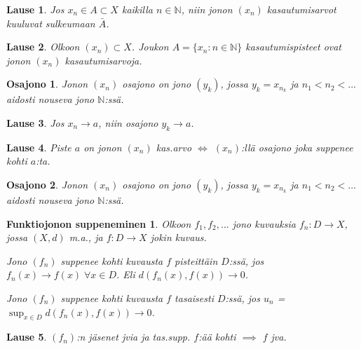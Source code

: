 \documentclass[landscape,a4paper,9pt]{extarticle}
\theoremstyle{customtheoremstyle}
\newtheorem*{theorem}{Lause}
\begin{document}
\begin{multicols*}{3}
\begin{theorem}
  Jos $x_n \in A \subset X$ kaikilla $n \in \mathbb{N}$, niin jonon $(x_n)$
  kasautumisarvot kuuluvat sulkeumaan $\bar{A}$.
\end{theorem}

\begin{theorem}
  Olkoon $(x_n) \subset X$. Joukon $A = \{x_n : n \in \mathbb{N} \}$
  kasautumispisteet ovat jonon $(x_n)$ kasautumisarvoja.
\end{theorem}

\newtheorem*{defn:osajono}{Osajono}
\begin{defn:osajono}
  Jonon $(x_n)$ osajono on jono $(y_k)$, jossa $y_k = x_{n_k}$ ja $n_1 < n_2 <
  ...$ aidosti nouseva jono $\mathbb{N}$:ssä.
\end{defn:osajono}

\begin{theorem}
  Jos $x_n \rightarrow a$, niin osajono $y_k \rightarrow a$.
\end{theorem}

\begin{theorem}
  Piste $a$ on jonon $(x_n)$ kas.arvo $\iff$ $(x_n)$:llä osajono joka suppenee
  kohti $a$:ta.
\end{theorem}

\newtheorem*{defn:}{Osajono}
\begin{defn:osajono}
  Jonon $(x_n)$ osajono on jono $(y_k)$, jossa $y_k = x_{n_k}$ ja $n_1 < n_2 <
  ...$ aidosti nouseva jono $\mathbb{N}$:ssä.
\end{defn:osajono}

\newtheorem*{defn:funktiojono}{Funktiojonon suppeneminen}
\begin{defn:funktiojono}
  Olkoon $f_1, f_2, ...$ jono kuvauksia $f_n : D \rightarrow X$, jossa $(X,d)$
  m.a., ja $f: D \rightarrow X$ jokin kuvaus.

  Jono $(f_n)$ suppenee kohti kuvausta $f$ \emph{pisteittäin}
  $D$:ssä, jos $f_n(x) \rightarrow f(x) \; \forall x \in D$. Eli
  $d(f_n(x), f(x)) \rightarrow 0$.

  Jono $(f_n)$ suppenee kohti kuvausta $f$ \emph{tasaisesti} $D$:ssä, jos
  $u_n$ = $\sup_{x \in D} d(f_n(x), f(x)) \rightarrow 0 $.
\end{defn:funktiojono}

\begin{theorem}
  $(f_n)$:n jäsenet jvia ja tas.supp. $f$:ää kohti $\implies$ $f$ jva.
\end{theorem}


\end{multicols*}
\end{document}
